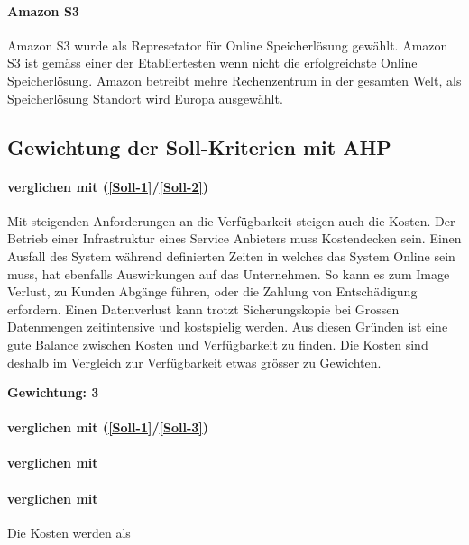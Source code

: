 \paragraph{Amazon S3}\label{Al-5}
Amazon S3 wurde als Represetator für Online Speicherlösung gewählt. Amazon S3 ist gemäss  einer der Etabliertesten wenn nicht die erfolgreichste Online Speicherlösung. Amazon betreibt mehre Rechenzentrum in der gesamten Welt, als Speicherlösung Standort wird Europa ausgewählt.


\subsection{Gewichtung der Soll-Kriterien mit AHP}

\paragraph*{ verglichen mit  (\ref{Soll-1}/\ref{Soll-2})} 
Mit steigenden Anforderungen an die Verfügbarkeit steigen auch die Kosten. Der Betrieb einer Infrastruktur eines Service Anbieters muss Kostendecken sein. Einen Ausfall des System während definierten Zeiten in welches das System Online sein muss, hat ebenfalls Auswirkungen auf das Unternehmen. So kann es zum Image Verlust, zu Kunden Abgänge führen, oder die Zahlung von Entschädigung erfordern. Einen Datenverlust kann trotzt Sicherungskopie bei Grossen Datenmengen zeitintensive und kostspielig werden. Aus diesen Gründen ist eine gute Balance zwischen Kosten und Verfügbarkeit zu finden. Die Kosten sind deshalb im Vergleich zur Verfügbarkeit etwas grösser zu Gewichten.

\textbf{Gewichtung: 3}

\paragraph*{ verglichen mit  (\ref{Soll-1}/\ref{Soll-3})}

\paragraph*{ verglichen mit }

\paragraph*{ verglichen mit }
Die Kosten werden als 
